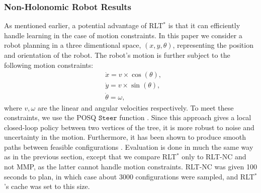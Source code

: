 \documentclass[letterpaper, 10 pt, conference]{ieeeconf}
\begin{document}
  \subsubsection{Non-Holonomic Robot Results}
  As mentioned earlier, a potential advantage of RLT$^*$ is that it can efficiently handle learning in the case of motion constraints. In this paper we consider a robot planning in a three dimentional space, $(x,y,\theta)$, representing the position and orientation of the robot. The robot's motion is further subject to the following motion constraints:
%
  \begin{align}
  	&\dot{x} = v\times\cos(\theta),\\
  	&\dot{y} = v\times\sin(\theta),\\
  	&\dot{\theta} = \omega,
  \end{align}
  where $v,\omega$ are the linear and angular velocities respectively.
  To meet these constraints, we use the POSQ $\texttt{Steer}$ function \cite{palmieri2014novel}.  Since this approach gives a local closed-loop policy between two vertices of the tree, it is  more robust to noise and uncertainty in the motion. Furthermore, it has been shown to produce smooth paths between feasible configurations \cite{palmieri2014novel}. Evaluation is done in much the same way as in the previous section, except that we compare RLT$^*$ only to RLT-NC and not MMP, as the latter cannot handle motion constraints.
RLT-NC was given 100 seconds to plan, in which case about 3000 configurations were sampled, and RLT$^*$'s cache was set to this size. 
\end{document}
